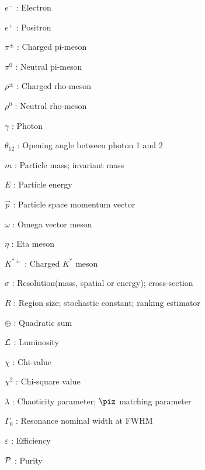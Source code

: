 %
%
\begin{singlespacing}
\begin{list}{}{}
\item $e^{-}$ : Electron
\item $e^{+}$ : Positron
\item $\pi^{\pm}$ : Charged pi-meson
\item $\pi^{0}$ : Neutral pi-meson
\item $\rho^{\pm}$ : Charged rho-meson
\item $\rho^{0}$ : Neutral rho-meson
\item $\gamma$ : Photon
\item $\theta_{12}$ : Opening angle between photon 1 and 2
\item $m$ : Particle mass; invariant mass
\item $E$ : Particle energy
\item $\vec{p}$ : Particle space momentum vector
\item $\omega$ : Omega vector meson
\item $\eta$ : Eta meson
\item $K^{* \pm}$ : Charged $K^*$ meson
\item $\sigma$ : Resolution(mass, spatial or energy); cross-section
\item $R$ : Region size; stochastic constant; ranking estimator
\item $\oplus$ : Quadratic sum
\item $\cal L$ : Luminosity
\item $\chi$ : Chi-value
\item $\chi^{2}$ : Chi-square value
\item $\lambda$ : Chaoticity parameter; $\piz$ matching parameter
\item $\Gamma_0$ : Resonance nominal width at FWHM
\item $\varepsilon$ : Efficiency
\item $\cal{P}$ : Purity
\end{list}
\end{singlespacing}
